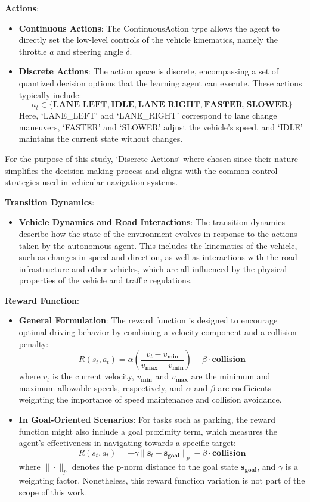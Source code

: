 \documentclass{article}
\begin{document}
\textbf{Actions}:
\begin{itemize}
  \item \textbf{Continuous Actions}: The ContinuousAction type allows the agent to directly set the low-level controls of the vehicle kinematics, namely the throttle $a$ and steering angle $\delta$.
  \item \textbf{Discrete Actions}: The action space is discrete, encompassing a set of quantized decision options that the learning agent can execute. These actions typically include:
    \[
    a_t \in \{\mathbf{LANE\_LEFT}, \mathbf{IDLE}, \mathbf{LANE\_RIGHT}, \mathbf{FASTER}, \mathbf{SLOWER}\}
    \]
  Here, `LANE\_LEFT' and `LANE\_RIGHT' correspond to lane change maneuvers, `FASTER' and `SLOWER' adjust the vehicle's speed, and `IDLE' maintains the current state without changes.
\end{itemize}

For the purpose of this study, `Discrete Actions` where chosen since their nature simplifies the decision-making process and aligns with the common control strategies used in vehicular navigation systems.

\textbf{Transition Dynamics}:
\begin{itemize}
  \item \textbf{Vehicle Dynamics and Road Interactions}: The transition dynamics describe how the state of the environment evolves in response to the actions taken by the autonomous agent. This includes the kinematics of the vehicle, such as changes in speed and direction, as well as interactions with the road infrastructure and other vehicles, which are all influenced by the physical properties of the vehicle and traffic regulations.
\end{itemize}

\textbf{Reward Function}:
\begin{itemize}
  \item \textbf{General Formulation}: The reward function is designed to encourage optimal driving behavior by combining a velocity component and a collision penalty:
    \[
    R(s_t, a_t) = \alpha \left(\frac{v_t - v_{\mathbf{min}}}{v_{\mathbf{max}} - v_{\mathbf{min}}}\right) - \beta \cdot \mathbf{collision}
    \]
  where $v_t$ is the current velocity, $v_{\mathbf{min}}$ and $v_{\mathbf{max}}$ are the minimum and maximum allowable speeds, respectively, and $\alpha$ and $\beta$ are coefficients weighting the importance of speed maintenance and collision avoidance.
  
  \item \textbf{In Goal-Oriented Scenarios}: For tasks such as parking, the reward function might also include a goal proximity term, which measures the agent's effectiveness in navigating towards a specific target:
    \[
    R(s_t, a_t) = -\gamma \|\mathbf{s}_t - \mathbf{s}_{\mathbf{goal}}\|_p - \beta \cdot \mathbf{collision}
    \]
  where $\|\cdot\|_p$ denotes the p-norm distance to the goal state $\mathbf{s}_{\mathbf{goal}}$, and $\gamma$ is a weighting factor. Nonetheless, this reward function variation is not part of the scope of this work.
\end{itemize}
\end{document}
